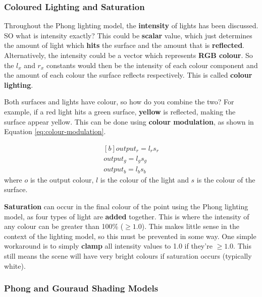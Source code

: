 \documentclass{article}
\begin{document}
\subsubsection{Coloured Lighting and Saturation}

Throughout the Phong lighting model, the \textbf{intensity} of lights has been discussed. SO what is intensity exactly? This could be \textbf{scalar} value, which just determines the amount of light which \textbf{hits} the surface and the amount that is \textbf{reflected}. Alternatively, the intensity could be a vector which represents \textbf{RGB colour}. So the $l_{x}$ and $r_{x}$ constants would then be the intensity of each colour component and the amount of each colour the surface reflects respectively. This is called \textbf{colour lighting}.

Both surfaces and lights have colour, so how do you combine the two? For example, if a red light hits a green surface, \textbf{yellow} is reflected, making the surface appear yellow. This can be done using \textbf{colour modulation}, as shown in Equation \ref{eq:colour-modulation}.

\begin{equation}
\begin{aligned}[b]
	output_r = l_r s_r \\
 	output_g = l_g s_g \\
	output_b = l_b s_b
\end{aligned}
\label{eq:colour-modulation}
\end{equation}
where $o$ is the output colour, $l$ is the colour of the light and $s$ is the colour of the surface.

\textbf{Saturation} can occur in the final colour of the point using the Phong lighting model, as four types of light are \textbf{added} together. This is where the intensity of any colour can be greater than 100\% ($\geq 1.0$). This makes little sense in the context of the lighting model, so this must be prevented in some way. One simple workaround is to simply \textbf{clamp} all intensity values to 1.0 if they're $\geq 1.0$. This still means the scene will have very bright colours if saturation occurs (typically white).

\subsubsection{Phong and Gouraud Shading Models}
\end{document}
